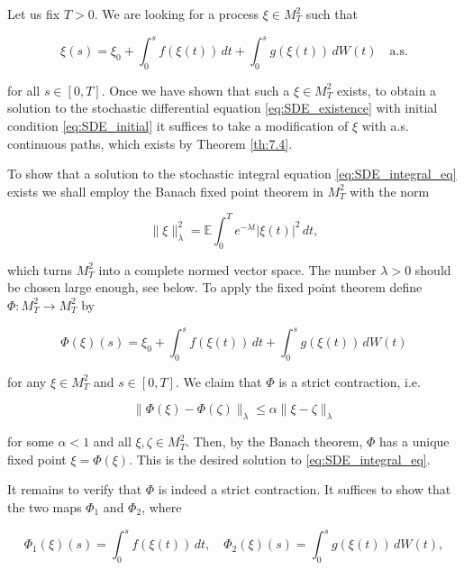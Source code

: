 \begin{Proof}[Outline]
Let us fix $T > 0$. We are looking for a process $\xi \in M_T^2$ such that

\begin{equation}
\xi(s) = \xi_0 + \int_0^s f(\xi(t)) \, dt + \int_0^s g(\xi(t)) \, dW(t) \quad \text{a.s.}
\label{eq:SDE_integral_eq}
\end{equation}

for all $s \in [0, T]$. Once we have shown that such a $\xi \in M_T^2$ exists, to obtain a solution to the stochastic differential equation \eqref{eq:SDE_existence} with initial condition \eqref{eq:SDE_initial} it suffices to take a modification of $\xi$ with a.s. continuous paths, which exists by Theorem \ref{th:7.4}.

To show that a solution to the stochastic integral equation \eqref{eq:SDE_integral_eq} exists we shall employ the Banach fixed point theorem in $M_T^2$ with the norm

\begin{equation}
\|\xi\|_{\lambda}^2 = \mathbb{E} \int_0^T e^{-\lambda t} |\xi(t)|^2 \, dt,
\label{eq:weighted_norm}
\end{equation}

which turns $M_T^2$ into a complete normed vector space. The number $\lambda > 0$ should be chosen large enough, see below. To apply the fixed point theorem define $\Phi: M_T^2 \to M_T^2$ by

\begin{equation}
\Phi(\xi)(s) = \xi_0 + \int_0^s f(\xi(t)) \, dt + \int_0^s g(\xi(t)) \, dW(t)
\label{eq:fixed_point_map}
\end{equation}

for any $\xi \in M_T^2$ and $s \in [0, T]$. We claim that $\Phi$ is a strict contraction, i.e.

\begin{equation}
\|\Phi(\xi) - \Phi(\zeta)\|_{\lambda} \leq \alpha \|\xi - \zeta\|_{\lambda}
\label{eq:contraction}
\end{equation}

for some $\alpha < 1$ and all $\xi, \zeta \in M_T^2$. Then, by the Banach theorem, $\Phi$ has a unique fixed point $\xi = \Phi(\xi)$. This is the desired solution to \eqref{eq:SDE_integral_eq}.

It remains to verify that $\Phi$ is indeed a strict contraction. It suffices to show that the two maps $\Phi_1$ and $\Phi_2$, where

\begin{equation}
\Phi_1(\xi)(s) = \int_0^s f(\xi(t)) \, dt, \quad \Phi_2(\xi)(s) = \int_0^s g(\xi(t)) \, dW(t),
\end{equation}


\end{Proof}
